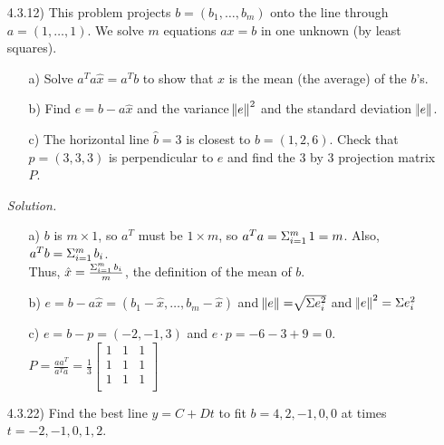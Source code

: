 \documentclass[12pt]{article}
\begin{document}
\begin{itemize}
\item[4.3.12)] This problem projects $b=(b_1,\ldots,b_m)$ onto the line through $a=(1,\ldots,1)$. We solve $m$ equations $ax=b$ in one unknown (by least squares).
\begin{itemize}
\item[a)] Solve $a^Ta\hat{x}=a^Tb$ to show that $\hat{x}$ is the mean (the average) of the $b$'s.
\item[b)] Find $e=b-a\hat{x}$ and the variance $\norm{e}^2$ and the standard deviation $\norm{e}$.
\item[c)] The horizontal line $\hat{b}=3$ is closest to $b=(1,2,6)$. Check that $p=(3,3,3)$ is perpendicular to $e$ and find the 3 by 3 projection matrix $P$.
\end{itemize}

\textit{Solution.}
\begin{itemize}
\item[a)] $b$ is $m \times 1$, so $a^T$ must be $1 \times m$, so $a^Ta=\Sigma_{i=1}^{m}\hspace{0.5mm}1=m$. Also, $a^Tb=\Sigma_{i=1}^{m}\hspace{0.5mm}b_i$. \\
Thus, $\hat{x}=\frac{\Sigma_{i=1}^{m}\hspace{0.5mm}b_i}{m}$, the definition of the mean of $b$.
\item[b)] $e=b-a\hat{x}=(b_1-\hat{x},\ldots,b_m-\hat{x})$ and $\norm{e} = \sqrt[]{\Sigma e_i^2}$ and $\norm{e}^2=\Sigma e_i^2$
\item[c)] $e=b-p=(-2,-1,3)$ and $e \cdot p=-6-3+9=0$. \\
$P=\frac{aa^T}{a^Ta}=\frac{1}{3}\left[\begin{array}{ccc} 1 & 1 & 1\\ 1 & 1 & 1 \\ 1 & 1 & 1 \\\end{array}\right]$
\end{itemize}

\item[4.3.22)] Find the best line $y = C+Dt$ to fit $b=4,2,-1,0,0$ at times $t=-2,-1,0,1,2$.


\end{itemize}
\end{document}
